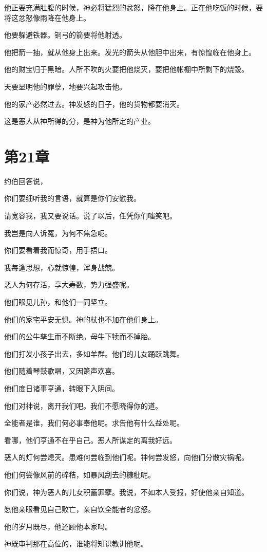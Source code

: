 \documentclass[12pt,oneside]{book}
\begin{document}
他正要充满肚腹的时候，神必将猛烈的忿怒，降在他身上。正在他吃饭的时候，要将这忿怒像雨降在他身上。

他要躲避铁器。铜弓的箭要将他射透。

他把箭一抽，就从他身上出来。发光的箭头从他胆中出来，有惊惶临在他身上。

他的财宝归于黑暗。人所不吹的火要把他烧灭，要把他帐棚中所剩下的烧毁。

天要显明他的罪孽，地要兴起攻击他。

他的家产必然过去。神发怒的日子，他的货物都要消灭。

这是恶人从神所得的分，是神为他所定的产业。


\chapter{第21章}
约伯回答说，

你们要细听我的言语，就算是你们安慰我。

请宽容我，我又要说话。说了以后，任凭你们嗤笑吧。

我岂是向人诉冤，为何不焦急呢。

你们要看着我而惊奇，用手捂口。

我每逢思想，心就惊惶，浑身战兢。

恶人为何存活，享大寿数，势力强盛呢。

他们眼见儿孙，和他们一同坚立。

他们的家宅平安无惧。神的杖也不加在他们身上。

他们的公牛孳生而不断绝。母牛下犊而不掉胎。

他们打发小孩子出去，多如羊群。他们的儿女踊跃跳舞。

他们随着琴鼓歌唱，又因箫声欢喜。

他们度日诸事亨通，转眼下入阴间。

他们对神说，离开我们吧。我们不愿晓得你的道。

全能者是谁，我们何必事奉他呢。求告他有什么益处呢。

看哪，他们亨通不在乎自己。恶人所谋定的离我好远。

恶人的灯何尝熄灭。患难何尝临到他们呢。神何尝发怒，向他们分散灾祸呢。

他们何尝像风前的碎秸，如暴风刮去的糠秕呢。

你们说，神为恶人的儿女积蓄罪孽。我说，不如本人受报，好使他亲自知道。

愿他亲眼看见自己败亡，亲自饮全能者的忿怒。

他的岁月既尽，他还顾他本家吗。

神既审判那在高位的，谁能将知识教训他呢。
\end{document}
